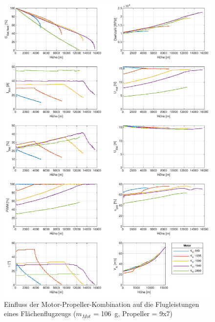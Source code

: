 \begin{figure}[H]
\centering
	\includegraphics[scale=0.7]{Diagramme/Flaechenflzg_Mot_Prop.pdf}
	\caption{Einfluss der Motor-Propeller-Kombination auf die Flugleistungen eines Flächenflugzeugs (\ensuremath{m_{Mot}} = \SI{106}{g}, Propeller = 9x7)}
	\label{abb:flaechenflzg_mot_prop}
\end{figure}

